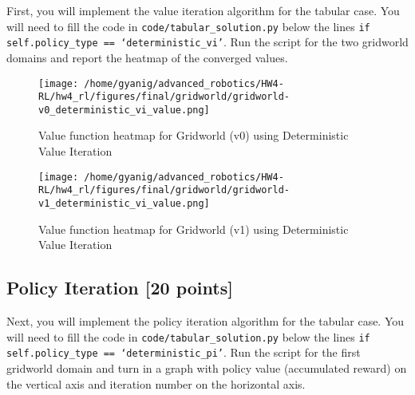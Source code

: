 \documentclass{article}
\begin{document}
First, you will implement the value iteration algorithm for the tabular case. You will need to fill the code in \texttt{code/tabular\_solution.py} below the lines \texttt{if self.policy\_type == `deterministic\_vi'}. Run the script for the two gridworld domains and report the heatmap of the converged values.

\begin{figure}[h]
    \centering
    \begin{minipage}[t]{0.45\textwidth}
        \centering
        \texttt{[image: /home/gyanig/advanced\_robotics/HW4-RL/hw4\_rl/figures/final/gridworld/gridworld-v0\_deterministic\_vi\_value.png]}
        \caption{Value function heatmap for Gridworld (v0) using Deterministic Value Iteration}
        \label{fig:gridworld_v0_det_vi}
    \end{minipage}
    \hfill
    \begin{minipage}[t]{0.45\textwidth}
        \centering
        \texttt{[image: /home/gyanig/advanced\_robotics/HW4-RL/hw4\_rl/figures/final/gridworld/gridworld-v1\_deterministic\_vi\_value.png]}
        \caption{Value function heatmap for Gridworld (v1) using Deterministic Value Iteration}
        \label{fig:gridworld_v1_det_vi}
    \end{minipage}
\end{figure}

\newpage
\subsection{Policy Iteration [20 points]}


Next, you will implement the policy iteration algorithm for the tabular case. You will need to fill the code in \texttt{code/tabular\_solution.py} below the lines \texttt{if self.policy\_type == `deterministic\_pi'}. Run the script for the first gridworld domain and turn in a graph with policy value (accumulated reward) on the vertical axis and iteration number on the horizontal axis.
\end{document}
